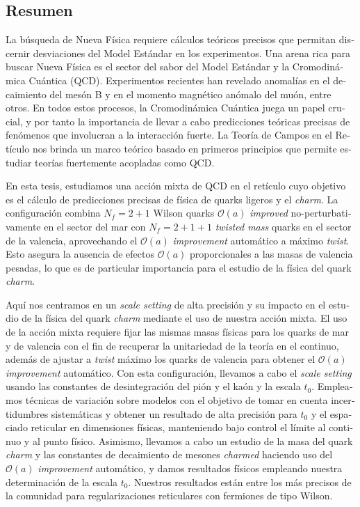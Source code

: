 \vfill

\begin{otherlanguage}{spanish}
\chapter*{Resumen}

La búsqueda de Nueva Física requiere cálculos teóricos precisos que permitan discernir desviaciones del Model Estándar en los experimentos. Una arena rica para buscar Nueva Física es el sector del sabor del Model Estándar y la Cromodinámica Cuántica (QCD). Experimentos recientes han revelado anomalías en el decaimiento del mesón B y en el momento magnético anómalo del muón, entre otros. En todos estos procesos, la Cromodinámica Cuántica juega un papel crucial, y por tanto la importancia de llevar a cabo predicciones teóricas precisas de fenómenos que involucran a la interacción fuerte. La Teoría de Campos en el Retículo nos brinda un marco teórico basado en primeros principios que permite estudiar teorías fuertemente acopladas como QCD.

En esta tesis, estudiamos una acción mixta de QCD en el retículo cuyo objetivo es el cálculo de predicciones precisas de física de quarks ligeros y el \textit{charm}. La configuración combina $N_f=2+1$ Wilson quarks $\mathcal{O}(a)$ \textit{improved} no-perturbativamente en el sector del mar con $N_f=2+1+1$ \textit{twisted mass} quarks en el sector de la valencia, aprovechando el $\mathcal{O}(a)$ \textit{improvement} automático a máximo \textit{twist}. Esto asegura la ausencia de efectos $\mathcal{O}(a)$ proporcionales a las masas de valencia pesadas, lo que es de particular importancia para el estudio de la física del quark \textit{charm}.

Aquí nos centramos en un \textit{scale setting} de alta precisión y su impacto en el estudio de la física del quark \textit{charm} mediante el uso de nuestra acción mixta. El uso de la acción mixta requiere fijar las mismas masas físicas para los quarks de mar y de valencia con el fin de recuperar la unitariedad de la teoría en el continuo, además de ajustar a \textit{twist} máximo los quarks de valencia para obtener el $\mathcal{O}(a)$ \textit{improvement} automático. Con esta configuración, llevamos a cabo el \textit{scale setting} usando las constantes de desintegración del pión y el kaón y la escala $t_0$. Empleamos técnicas de variación sobre modelos con el objetivo de tomar en cuenta incertidumbres sistemáticas y obtener un resultado de alta precisión para $t_0$ y el espaciado reticular en dimensiones físicas, manteniendo bajo control el límite al continuo y al punto físico. Asimismo, llevamos a cabo un estudio de la masa del quark \textit{charm} y las constantes de decaimiento de mesones \textit{charmed} haciendo uso del $\mathcal{O}(a)$ \textit{improvement} automático, y damos resultados físicos empleando nuestra determinación de la escala $t_0$. Nuestros resultados están entre los más precisos de la comunidad para regularizaciones reticulares con fermiones de tipo Wilson.

\end{otherlanguage}

\endgroup

\vfill
